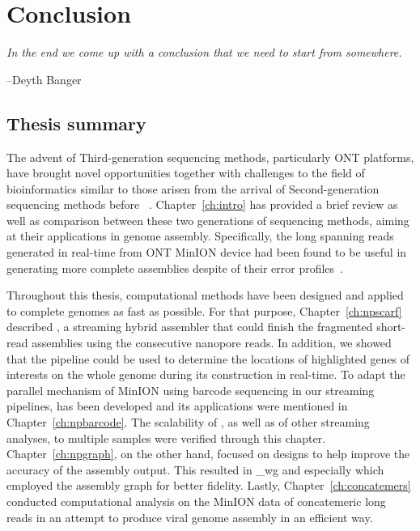 \chapter{Conclusion}\label{ch:conclusion}
\thispagestyle{empty}
\vspace*{\fill}
\epigraph{\emph{In the end we come up with a conclusion that we need to start from somewhere.}}
{--Deyth Banger}

\clearpage

\section{Thesis summary}
The advent of Third-generation sequencing methods, particularly ONT platforms, have brought novel opportunities together with challenges to the field of bioinformatics similar to those arisen from the arrival of Second-generation sequencing methods before ~\cite{SchadtTK2010,ThkurRB2012}.
Chapter~\ref{ch:intro} has provided a brief review as well as comparison between these two generations of sequencing methods, aiming at their applications in genome assembly.
Specifically, the long spanning reads generated in real-time from ONT MinION device had been found to be useful in generating more complete assemblies despite of their error profiles~\cite{GoodwinGE2015,MadouiEC2015,Karlsson2015}. 

Throughout this thesis, computational methods have been designed and applied to complete genomes as fast as possible.   
For that purpose, Chapter~\ref{ch:npscarf} described \npscarf{}, a streaming hybrid assembler that could finish the fragmented short-read assemblies using the consecutive nanopore reads. In addition, we showed that the pipeline could be used to determine the locations of highlighted genes of interests on the whole genome during its construction in real-time.
To adapt the parallel mechanism of MinION using barcode sequencing in our streaming pipelines, \npbarcode{} has been developed and its applications were mentioned in Chapter~\ref{ch:npbarcode}. The scalability of \npscarf{}, as well as of other streaming analyses, to multiple samples were verified through this chapter.
Chapter~\ref{ch:npgraph}, on the other hand, focused on designs to help improve the accuracy of the assembly output. This resulted in \npscarf{}\_wg and especially \npgraph{} which employed the assembly graph for better fidelity.
Lastly, Chapter~\ref{ch:concatemers} conducted computational analysis on the MinION data of concatemeric long reads in an attempt to produce viral genome assembly in an efficient way.

